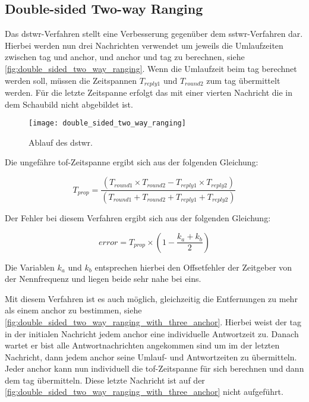 \subsection{Double-sided Two-way Ranging}
\label{subsec:double_sided_two_way_ranging}

Das \Gls{dstwr}-Verfahren stellt eine Verbesserung gegenüber dem \Gls{sstwr}-Verfahren dar. Hierbei werden nun drei Nachrichten verwendet um jeweils die Umlaufzeiten zwischen \Gls{tag} und \Gls{anchor}, und \Gls{anchor} und \Gls{tag} zu berechnen, siehe \autoref{fig:double_sided_two_way_ranging}. Wenn die Umlaufzeit beim \Gls{tag} berechnet werden soll, müssen die Zeitspannen $T_{reply1}$ und $T_{round2}$ zum \Gls{tag} übermittelt werden. Für die letzte Zeitspanne erfolgt das mit einer vierten Nachricht die in dem Schaubild nicht abgebildet ist. \cite{decawave2015twr, decawave2016dw1kusermanual}

\begin{figure}
	\centering
	\texttt{[image: double\_sided\_two\_way\_ranging]}
	\caption{Ablauf des \acrlong{dstwr}.}
	\label{fig:double_sided_two_way_ranging}
\end{figure}

Die ungefähre \Gls{tof}-Zeitspanne ergibt sich aus der folgenden Gleichung:

\begin{equation}
T_{prop} = \frac{\left(T_{round1}\times T_{round2}-T_{reply1}\times T_{reply2}\right)}{\left(T_{round1}+T_{round2}+T_{reply1}+T_{reply2}\right)}
\end{equation}

Der Fehler bei diesem Verfahren ergibt sich aus der folgenden Gleichung:

\begin{equation}
error=T_{prop}\times\left(1-\frac{k_a+k_b}{2}\right)
\end{equation}

Die Variablen $k_a$ und $k_b$ entsprechen hierbei den Offsetfehler der Zeitgeber von der Nennfrequenz und liegen beide sehr nahe bei eins.

Mit diesem Verfahren ist es auch möglich, gleichzeitig die Entfernungen zu mehr als einem \Gls{anchor} zu bestimmen, siehe \autoref{fig:double_sided_two_way_ranging_with_three_anchor}. Hierbei weist der \Gls{tag} in der initialen Nachricht jedem \Gls{anchor} eine individuelle Antwortzeit zu. Danach wartet er bist alle Antwortnachrichten angekommen sind um im der letzten Nachricht, dann jedem \Gls{anchor} seine Umlauf- und Antwortzeiten zu übermitteln. Jeder \Gls{anchor} kann nun individuell die \Gls{tof}-Zeitspanne für sich berechnen und dann dem \Gls{tag} übermitteln. Diese letzte Nachricht ist auf der \autoref{fig:double_sided_two_way_ranging_with_three_anchor} nicht aufgeführt.

